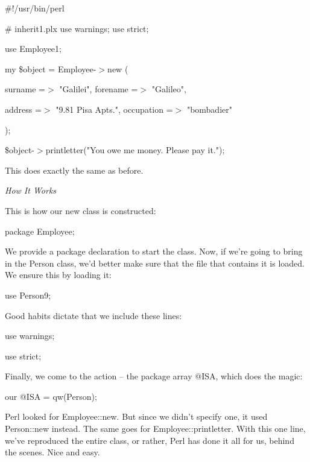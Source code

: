 \documentclass[a4paper,11pt]{book}
\begin{document}
\noindent 

\noindent \#!/usr/bin/perl

\noindent \# inherit1.plx use warnings; use strict;

\noindent use Employee1;

\noindent 

\noindent 

\noindent my \$object = Employee-$>$new (

\noindent surname =$>$ "Galilei", forename =$>$ "Galileo",

\noindent address =$>$ "9.81 Pisa Apts.", occupation =$>$ "bombadier"

\noindent );

\noindent 

\noindent \$object-$>$printletter("You owe me money. Please pay it.");

\noindent 

\noindent This does exactly the same as before.

\noindent 

\noindent \textit{How It Works}

\noindent This is how our new class is constructed:

\noindent 

\noindent package Employee;

\noindent 

\noindent We provide a package declaration to start the class. Now, if we're going to bring in the Person class, we'd better make sure that the file that contains it is loaded. We ensure this by loading it:

\noindent 

\noindent use Person9;

\noindent 

\noindent Good habits dictate that we include these lines:

\noindent 

\noindent use warnings;

\noindent use strict;

\noindent 

\noindent Finally, we come to the action -- the package array @ISA, which does the magic:

\noindent 

\noindent our @ISA = qw(Person);

\noindent 

\noindent Perl looked for Employee::new. But since we didn't specify one, it used Person::new instead. The same goes for Employee::printletter. With this one line, we've reproduced the entire class, or rather, Perl has done it all for us, behind the scenes. Nice and easy.
\end{document}

